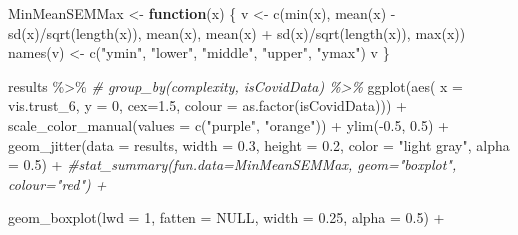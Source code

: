 \documentclass[
]{article}
\newenvironment{Shaded}{\begin{snugshade}}{\end{snugshade}}
\newcommand{\AttributeTok}[1]{\textcolor[rgb]{0.77,0.63,0.00}{#1}}
\newcommand{\CommentTok}[1]{\textcolor[rgb]{0.56,0.35,0.01}{\textit{#1}}}
\newcommand{\ConstantTok}[1]{\textcolor[rgb]{0.00,0.00,0.00}{#1}}
\newcommand{\ControlFlowTok}[1]{\textcolor[rgb]{0.13,0.29,0.53}{\textbf{#1}}}
\newcommand{\DecValTok}[1]{\textcolor[rgb]{0.00,0.00,0.81}{#1}}
\newcommand{\FloatTok}[1]{\textcolor[rgb]{0.00,0.00,0.81}{#1}}
\newcommand{\FunctionTok}[1]{\textcolor[rgb]{0.00,0.00,0.00}{#1}}
\newcommand{\NormalTok}[1]{#1}
\newcommand{\OtherTok}[1]{\textcolor[rgb]{0.56,0.35,0.01}{#1}}
\newcommand{\SpecialCharTok}[1]{\textcolor[rgb]{0.00,0.00,0.00}{#1}}
\newcommand{\StringTok}[1]{\textcolor[rgb]{0.31,0.60,0.02}{#1}}
\begin{document}
\begin{Shaded}
\begin{Highlighting}[]
\NormalTok{MinMeanSEMMax }\OtherTok{\textless{}{-}} \ControlFlowTok{function}\NormalTok{(x) \{}
\NormalTok{  v }\OtherTok{\textless{}{-}} \FunctionTok{c}\NormalTok{(}\FunctionTok{min}\NormalTok{(x), }\FunctionTok{mean}\NormalTok{(x) }\SpecialCharTok{{-}} \FunctionTok{sd}\NormalTok{(x)}\SpecialCharTok{/}\FunctionTok{sqrt}\NormalTok{(}\FunctionTok{length}\NormalTok{(x)), }\FunctionTok{mean}\NormalTok{(x), }\FunctionTok{mean}\NormalTok{(x) }\SpecialCharTok{+} \FunctionTok{sd}\NormalTok{(x)}\SpecialCharTok{/}\FunctionTok{sqrt}\NormalTok{(}\FunctionTok{length}\NormalTok{(x)), }\FunctionTok{max}\NormalTok{(x))}
  \FunctionTok{names}\NormalTok{(v) }\OtherTok{\textless{}{-}} \FunctionTok{c}\NormalTok{(}\StringTok{"ymin"}\NormalTok{, }\StringTok{"lower"}\NormalTok{, }\StringTok{"middle"}\NormalTok{, }\StringTok{"upper"}\NormalTok{, }\StringTok{"ymax"}\NormalTok{)}
\NormalTok{  v}
\NormalTok{\}}

\NormalTok{results }\SpecialCharTok{\%\textgreater{}\%}
  \CommentTok{\# group\_by(complexity, isCovidData) \%\textgreater{}\%}
  \FunctionTok{ggplot}\NormalTok{(}\FunctionTok{aes}\NormalTok{( }\AttributeTok{x =}\NormalTok{ vis.trust\_6, }\AttributeTok{y =} \DecValTok{0}\NormalTok{, }\AttributeTok{cex=}\FloatTok{1.5}\NormalTok{, }\AttributeTok{colour =} \FunctionTok{as.factor}\NormalTok{(isCovidData))) }\SpecialCharTok{+}
  \FunctionTok{scale\_color\_manual}\NormalTok{(}\AttributeTok{values =} \FunctionTok{c}\NormalTok{(}\StringTok{"purple"}\NormalTok{, }\StringTok{"orange"}\NormalTok{)) }\SpecialCharTok{+}
  \FunctionTok{ylim}\NormalTok{(}\SpecialCharTok{{-}}\FloatTok{0.5}\NormalTok{, }\FloatTok{0.5}\NormalTok{) }\SpecialCharTok{+}
  \FunctionTok{geom\_jitter}\NormalTok{(}\AttributeTok{data =}\NormalTok{ results, }\AttributeTok{width =} \FloatTok{0.3}\NormalTok{, }\AttributeTok{height =} \FloatTok{0.2}\NormalTok{, }\AttributeTok{color =} \StringTok{"light gray"}\NormalTok{, }\AttributeTok{alpha =} \FloatTok{0.5}\NormalTok{) }\SpecialCharTok{+}
  \CommentTok{\#stat\_summary(fun.data=MinMeanSEMMax, geom="boxplot", colour="red") +}

  \FunctionTok{geom\_boxplot}\NormalTok{(}\AttributeTok{lwd =} \DecValTok{1}\NormalTok{, }\AttributeTok{fatten =} \ConstantTok{NULL}\NormalTok{, }\AttributeTok{width =} \FloatTok{0.25}\NormalTok{, }\AttributeTok{alpha =} \FloatTok{0.5}\NormalTok{) }\SpecialCharTok{+}


\end{Highlighting}
\end{Shaded}
\end{document}
